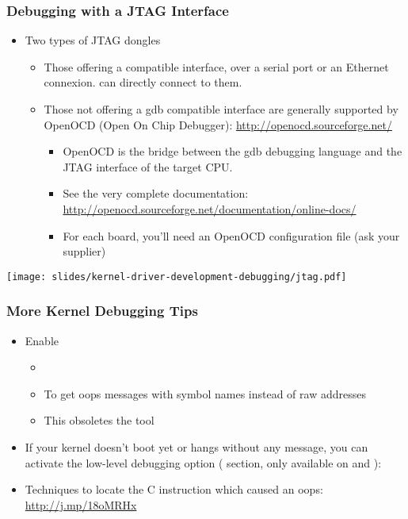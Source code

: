 \begin{frame}
  \frametitle{Debugging with a JTAG Interface}
  \begin{itemize}
  \item Two types of JTAG dongles
    \begin{itemize}
    \item Those offering a  compatible interface, over a
      serial port or an Ethernet connexion.  can directly
      connect to them.
    \item Those not offering a gdb compatible interface are generally
      supported by OpenOCD (Open On Chip Debugger):
      \url{http://openocd.sourceforge.net/}
      \begin{itemize}
      \item OpenOCD is the bridge between the gdb debugging language
        and the JTAG interface of the target CPU.
      \item See the very complete documentation:
        \url{http://openocd.sourceforge.net/documentation/online-docs/}
      \item For each board, you'll need an OpenOCD configuration file
        (ask your supplier)
      \end{itemize}
    \end{itemize}
  \end{itemize}
   \begin{center}
     \texttt{[image: slides/kernel-driver-development-debugging/jtag.pdf]}
   \end{center}
\end{frame}

\begin{frame}
  \frametitle{More Kernel Debugging Tips}
  \begin{itemize}
  \item Enable 
    \begin{itemize}
    \item {}
    \item To get oops messages with symbol names instead of raw addresses
    \item This obsoletes the  tool
    \end{itemize}
  \item If your kernel doesn't boot yet or hangs without any message,
    you can activate the low-level debugging option
    ( section, only available on  and
    ): 
  \item Techniques to locate the C instruction which caused an oops:
    \url{http://j.mp/18oMRHx}
  \end{itemize}
\end{frame}

